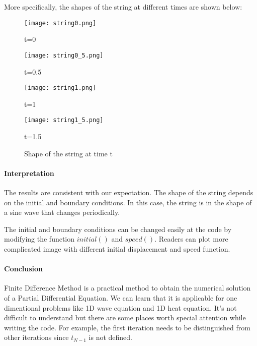 \documentclass[11pt]{article}
\begin{document}
More specifically, the shapes of the string at different times are shown below:

\begin{figure}[H]
	\centering
	\begin{minipage}{8cm}
		\texttt{[image: string0.png]}   
		\caption*{t=0}
		\end{minipage}    
	\begin{minipage}{8cm}
		\texttt{[image: string0\_5.png]}   
		\caption*{t=0.5}
	\end{minipage}  

    \begin{minipage}{8cm}
    	\texttt{[image: string1.png]}   
    	\caption*{t=1}
        \end{minipage}  
    \begin{minipage}{8cm}
    	\texttt{[image: string1\_5.png]}  
    	\caption*{t=1.5} 
    \end{minipage}  
	\caption{Shape of the string at time t}
\end{figure}



\paragraph{Interpretation}

The results are consistent with our expectation. The shape of the string depends on the initial and boundary conditions. In this case, the string is in the shape of a sine wave that changes periodically. 

The initial and boundary conditions can be changed easily at the code by modifying the function $initial()$ and $speed()$. Readers can plot more complicated image with different initial displacement and speed function.

\paragraph{Conclusion}
Finite Difference Method is a practical method to obtain the numerical solution of a Partial Differential Equation. We can learn that it is applicable for one dimentional problems like 1D wave equation and 1D heat equation. It's not difficult to understand but there are some places worth special attention while writing the code. For example, the first iteration needs to be distinguished from other iterations since $t_{N-1}$ is not defined. 
\end{document}

